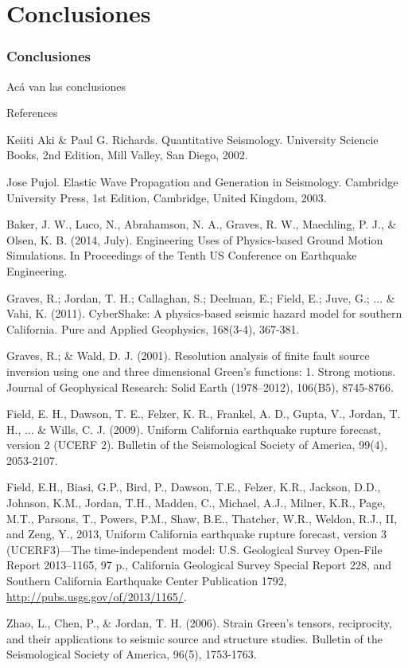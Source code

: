 \documentclass{beamer}
\begin{document}
\section{Conclusiones}
\begin{frame}[allowframebreaks]
\frametitle{Conclusiones}
%
\justifying
%
Acá van las conclusiones
%
\end{frame}
%
%
\begin{frame}[allowframebreaks]{References}
\def\newblock{}
%
%

\begin{thebibliography}{1}

 Keiiti Aki \& Paul G. Richards. {Q}uantitative {S}eismology. University Sciencie Books, 2nd Edition, Mill Valley, San Diego, 2002.

 Jose Pujol. Elastic Wave Propagation and Generation in Seismology. Cambridge University Press, 1st Edition, Cambridge, United Kingdom, 2003.

 Baker, J. W., Luco, N., Abrahamson, N. A., Graves, R. W., Maechling, P. J., \& Olsen, K. B. (2014, July). Engineering Uses of Physics-based Ground Motion Simulations. In Proceedings of the Tenth US Conference on Earthquake Engineering.

 Graves, R.; Jordan, T. H.; Callaghan, S.; Deelman, E.; Field, E.; Juve, G.; ... \& Vahi, K. (2011). CyberShake: A physics-based seismic hazard model for southern California. Pure and Applied Geophysics, 168(3-4), 367-381.

 Graves, R.; \& Wald, D. J. (2001). Resolution analysis of finite fault source inversion using one and three dimensional Green's functions: 1. Strong motions. Journal of Geophysical Research: Solid Earth (1978–2012), 106(B5), 8745-8766.

 Field, E. H., Dawson, T. E., Felzer, K. R., Frankel, A. D., Gupta, V., Jordan, T. H., ... \& Wills, C. J. (2009). Uniform California earthquake rupture forecast, version 2 (UCERF 2). Bulletin of the Seismological Society of America, 99(4), 2053-2107.

 Field, E.H., Biasi, G.P., Bird, P., Dawson, T.E., Felzer, K.R., Jackson, D.D., Johnson, K.M., Jordan, T.H., Madden, C., Michael, A.J., Milner, K.R., Page, M.T., Parsons, T., Powers, P.M., Shaw, B.E., Thatcher, W.R., Weldon, R.J., II, and Zeng, Y., 2013, Uniform California earthquake rupture forecast, version 3 (UCERF3)—The time-independent model: U.S. Geological Survey Open-File Report 2013–1165, 97 p., California Geological Survey Special Report 228, and Southern California Earthquake Center Publication 1792, \url{http://pubs.usgs.gov/of/2013/1165/}.

 Zhao, L., Chen, P., \& Jordan, T. H. (2006). Strain Green’s tensors, reciprocity, and their applications to seismic source and structure studies. Bulletin of the Seismological Society of America, 96(5), 1753-1763.

\end{thebibliography}

\end{frame}
\end{document}

